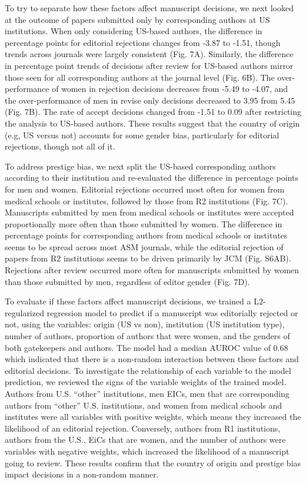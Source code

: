 \documentclass[11pt,]{article}
\begin{document}
To try to separate how these factors affect manuscript decisions, we
next looked at the outcome of papers submitted only by corresponding
authors at US institutions. When only considering US-based authors, the
difference in percentage points for editorial rejections changes from
-3.87 to -1.51, though trends across journals were largely consistent
(Fig. 7A). Similarly, the difference in percentage point trends of
decisions after review for US-based authors mirror those seen for all
corresponding authors at the journal level (Fig. 6B). The
over-performance of women in rejection decisions decreases from -5.49 to
-4.07, and the over-performance of men in revise only decisions
decreased to 3.95 from 5.45 (Fig. 7B). The rate of accept decisions
changed from -1.51 to 0.09 after restricting the analysis to US-based
authors. These results suggest that the country of origin (e.g, US
versus not) accounts for some gender bias, particularly for editorial
rejections, though not all of it.

To address prestige bias, we next split the US-based corresponding
authors according to their institution and re-evaluated the difference
in percentage points for men and women. Editorial rejections occurred
most often for women from medical schools or institutes, followed by
those from R2 institutions (Fig. 7C). Manuscripts submitted by men from
medical schools or institutes were accepted proportionally more often
than those submitted by women. The difference in percentage points for
corresponding authors from medical schools or institutes seems to be
spread across most ASM journals, while the editorial rejection of papers
from R2 institutions seems to be driven primarily by JCM (Fig. S6AB).
Rejections after review occurred more often for manuscripts submitted by
women than those submitted by men, regardless of editor gender (Fig.
7D).

To evaluate if these factors affect manuscript decisions, we trained a
L2-regularized regression model to predict if a manuscript was
editorially rejected or not, using the variables: origin (US vs non),
institution (US institution type), number of authors, proportion of
authors that were women, and the genders of both gatekeepers and
authors. The model had a median AUROC value of 0.68 which indicated that
there is a non-random interaction between these factors and editorial
decisions. To investigate the relationship of each variable to the model
prediction, we reviewed the signs of the variable weights of the trained
model. Authors from U.S. ``other'' institutions, men EICs, men that are
corresponding authors from ``other'' U.S. institutions, and women from
medical schools and institutes were all variables with positive weights,
which means they increased the likelihood of an editorial rejection.
Conversely, authors from R1 institutions, authors from the U.S., EiCs
that are women, and the number of authors were variables with negative
weights, which increased the likelihood of a manuscript going to review.
These results confirm that the country of origin and prestige bias
impact decisions in a non-random manner.
\end{document}
